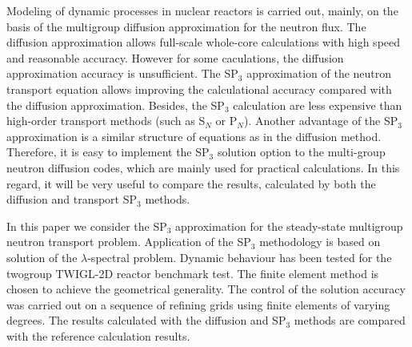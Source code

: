 \documentclass{crm-article}
\begin{document}
\begin{abstracteng}
Modeling of dynamic processes in nuclear reactors is carried out, mainly, on the basis of the multigroup diffusion approximation for the neutron flux.
The diffusion approximation allows full-scale whole-core calculations with high speed and reasonable accuracy. However for some caculations, the diffusion approximation accuracy is unsufficient. 
The SP$_3$ approximation of the neutron transport equation allows improving the calculational accuracy compared with the diffusion approximation. 
Besides, the SP$_3$ calculation are less expensive than high-order transport methods (such as S$_N$ or P$_N$). 
Another advantage of the SP$_3$ approximation is a similar structure of equations as in the diffusion method. 
Therefore, it is easy to implement the SP$_3$ solution option to the multi-group neutron diffusion codes, which are mainly used for practical calculations. 
In this regard, it will be very useful to compare the results, calculated by both the diffusion and transport SP$_3$ methods.

In this paper we consider the SP$_3$ approximation for the steady-state multigroup neutron transport problem.
Application of the SP$_3$ methodology is based on solution of the $\lambda$-spectral problem. 
Dynamic behaviour has been tested for the twogroup TWIGL-2D reactor benchmark test. 
The finite element method is chosen to achieve the geometrical generality. 
The control of the solution accuracy was carried out on a sequence of refining grids using finite elements of varying degrees.
The results calculated with the diffusion and SP$_3$ methods are compared with the reference calculation results. 
\end{abstracteng}



\maketitle

\end{document}
